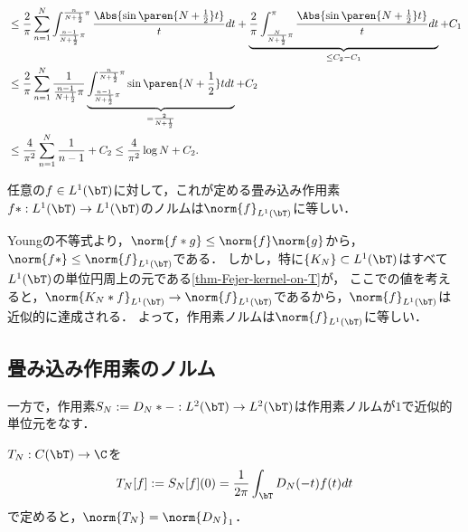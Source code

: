 \documentclass[uplatex,dvipdfmx]{jsreport}
\begin{document}
\begin{Proof}
\begin{enumerate}
\begin{align*}
        &\le\frac{2}{\pi}\sum_{n=1}^N\int^{\frac{n}{N+\frac{1}{2}}\pi}_{\frac{n-1}{N+\frac{1}{2}}\pi}\frac{\Abs{\sin\paren{N+\frac{1}{2}}t}}{t}dt+\underbrace{\frac{2}{\pi}\int^{\pi}_{\frac{N}{N+\frac{1}{2}}\pi}\frac{\Abs{\sin\paren{N+\frac{1}{2}}t}}{t}dt}_{\le C_2-C_1}+C_1\\
        &\le\frac{2}{\pi}\sum_{n=1}^N\frac{1}{\frac{n-1}{N+\frac{1}{2}}\pi}\underbrace{\int^{\frac{n}{N+\frac{1}{2}}\pi}_{\frac{n-1}{N+\frac{1}{2}}\pi}\sin\paren{N+\frac{1}{2}}tdt}_{=\frac{2}{N+\frac{1}{2}}}+C_2\\
        &\le\frac{4}{\pi^2}\sum_{n=1}^N\frac{1}{n-1}+C_2\le\frac{4}{\pi^2}\log N+C_2.
        \end{align*}
    \end{enumerate}
\end{Proof}

\begin{proposition}\label{prop-operator-norm-of-convolution}
    任意の$f\in L^1(\bT)$に対して，これが定める畳み込み作用素$f*:L^1(\bT)\to L^1(\bT)$のノルムは$\norm{f}_{L^1(\bT)}$に等しい．
\end{proposition}
\begin{Proof}
    Youngの不等式より，$\norm{f*g}\le\norm{f}\norm{g}$から，$\norm{f*}\le\norm{f}_{L^1(\bT)}$である．
    しかし，特に$\{K_N\}\subset L^1(\bT)$はすべて$L^1(\bT)$の単位円周上の元である\ref{thm-Fejer-kernel-on-T}が，
    ここでの値を考えると，$\norm{K_N*f}_{L^1(\bT)}\to\norm{f}_{L^1(\bT)}$であるから，$\norm{f}_{L^1(\bT)}$は近似的に達成される．
    よって，作用素ノルムは$\norm{f}_{L^1(\bT)}$に等しい．
\end{Proof}

\subsection{畳み込み作用素のノルム}

\begin{proposition}[一方で$L^2$-有界]
    一方で，作用素$S_N:=D_N*-:L^2(\bT)\to L^2(\bT)$は作用素ノルムが$1$で近似的単位元をなす．
\end{proposition}

\begin{proposition}[原点でのFourier係数を対応させる作用素の作用素ノルムもDirichlet核のノルムに一致する]
    $T_N:C(\bT)\to\C$を
    \[T_N[f]:=S_N[f](0)=\frac{1}{2\pi}\int_\bT D_N(-t)f(t)dt\]
    で定めると，$\norm{T_N}=\norm{D_N}_1$．
\end{proposition}
\end{document}
